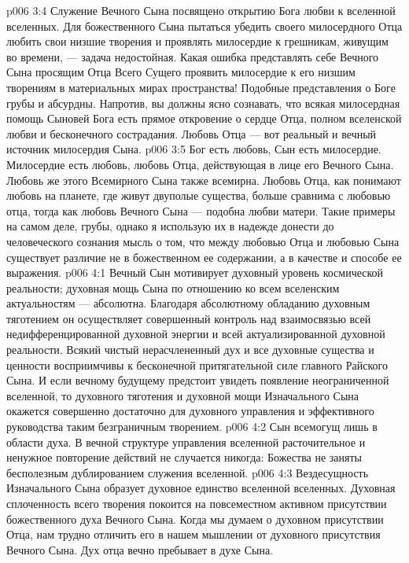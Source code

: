 \vs p006 3:4 Служение Вечного Сына посвящено открытию Бога любви к вселенной вселенных. Для божественного Сына пытаться убедить своего милосердного Отца любить свои низшие творения и проявлять милосердие к грешникам, живущим во времени, --- задача недостойная. Какая ошибка представлять себе Вечного Сына просящим Отца Всего Сущего проявить милосердие к его низшим творениям в материальных мирах пространства! Подобные представления о Боге грубы и абсурдны. Напротив, вы должны ясно сознавать, что всякая милосердная помощь Сыновей Бога есть прямое откровение о сердце Отца, полном вселенской любви и бесконечного сострадания. Любовь Отца --- вот реальный и вечный источник милосердия Сына.
\vs p006 3:5 Бог есть любовь, Сын есть милосердие. Милосердие есть любовь, любовь Отца, действующая в лице его Вечного Сына. Любовь же этого Всемирного Сына также всемирна. Любовь Отца, как понимают любовь на планете, где живут двуполые существа, больше сравнима с любовью отца, тогда как любовь Вечного Сына --- подобна любви матери. Такие примеры на самом деле, грубы, однако я использую их в надежде донести до человеческого сознания мысль о том, что между любовью Отца и любовью Сына существует различие не в божественном ее содержании, а в качестве и способе ее выражения.
\vs p006 4:1 Вечный Сын мотивирует духовный уровень космической реальности; духовная мощь Сына по отношению ко всем вселенским актуальностям --- абсолютна. Благодаря абсолютному обладанию духовным тяготением он осуществляет совершенный контроль над взаимосвязью всей недифференцированной духовной энергии и всей актуализированной духовной реальности. Всякий чистый нерасчлененный дух и все духовные существа и ценности восприимчивы к бесконечной притягательной силе главного Райского Сына. И если вечному будущему предстоит увидеть появление неограниченной вселенной, то духовного тяготения и духовной мощи Изначального Сына окажется совершенно достаточно для духовного управления и эффективного руководства таким безграничным творением.
\vs p006 4:2 \pc Сын всемогущ лишь в области духа. В вечной структуре управления вселенной расточительное и ненужное повторение действий не случается никогда: Божества не заняты бесполезным дублированием служения вселенной.
\vs p006 4:3 \pc Вездесущность Изначального Сына образует духовное единство вселенной вселенных. Духовная сплоченность всего творения покоится на повсеместном активном присутствии божественного духа Вечного Сына. Когда мы думаем о духовном присутствии Отца, нам трудно отличить его в нашем мышлении от духовного присутствия Вечного Сына. Дух отца вечно пребывает в духе Сына.
